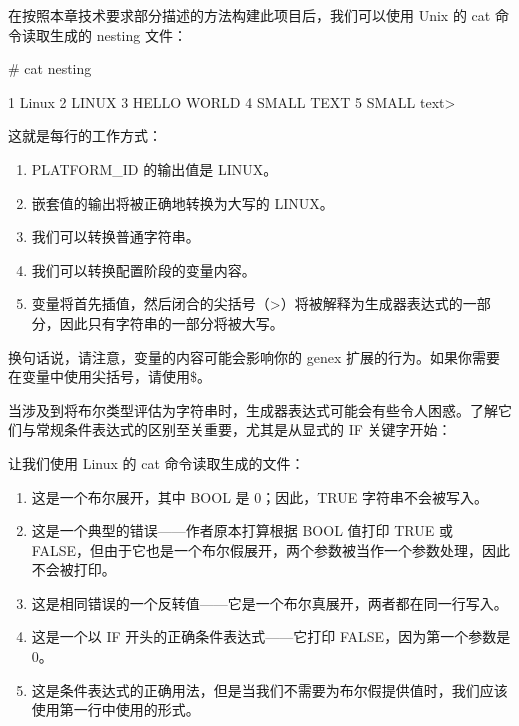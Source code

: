 在按照本章技术要求部分描述的方法构建此项目后，我们可以使用 Unix 的 cat 命令读取生成的 nesting 文件：

\begin{shell}
# cat nesting

    1 Linux
    2 LINUX
    3 HELLO WORLD
    4 SMALL TEXT
    5 SMALL text>
\end{shell}

这就是每行的工作方式：

\begin{enumerate}
\item
PLATFORM\_ID 的输出值是 LINUX。

\item
嵌套值的输出将被正确地转换为大写的 LINUX。

\item
我们可以转换普通字符串。

\item
我们可以转换配置阶段的变量内容。

\item
变量将首先插值，然后闭合的尖括号（>）将被解释为生成器表达式的一部分，因此只有字符串的一部分将被大写。
\end{enumerate}

换句话说，请注意，变量的内容可能会影响你的 genex 扩展的行为。如果你需要在变量中使用尖括号，请使用\$<ANGLE-R>。


当涉及到将布尔类型评估为字符串时，生成器表达式可能会有些令人困惑。了解它们与常规条件表达式的区别至关重要，尤其是从显式的 IF 关键字开始：



让我们使用 Linux 的 cat 命令读取生成的文件：

\begin{enumerate}
\item
这是一个布尔展开，其中 BOOL 是 0；因此，TRUE 字符串不会被写入。

\item
这是一个典型的错误——作者原本打算根据 BOOL 值打印 TRUE 或 FALSE，但由于它也是一个布尔假展开，两个参数被当作一个参数处理，因此不会被打印。

\item
这是相同错误的一个反转值——它是一个布尔真展开，两者都在同一行写入。

\item
这是一个以 IF 开头的正确条件表达式——它打印 FALSE，因为第一个参数是 0。

\item
这是条件表达式的正确用法，但是当我们不需要为布尔假提供值时，我们应该使用第一行中使用的形式。
\end{enumerate}

